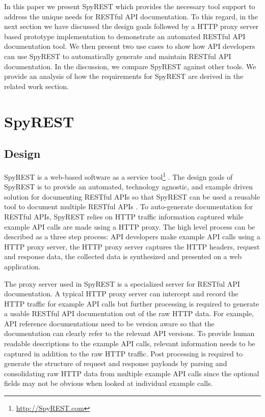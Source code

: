 \documentclass[conference]{IEEEtran}
\begin{document}
In this paper we present SpyREST which provides the necessary tool support to address the unique needs for RESTful API documentation. To this regard, in the next section we have discussed the design goals followed by a HTTP proxy server based prototype implementation to demonstrate an automated RESTful API documentation tool. We then present two use cases to show how API developers can use SpyREST to automatically generate and maintain RESTful API documentation. In the discussion, we compare SpyREST against other tools. We provide an analysis of how the requirements for SpyREST are derived in the related work section.

\section{SpyREST}

\subsection{Design} %
\label{sub:how_it_works}

SpyREST is a web-based software as a service tool\footnote{\url{http://SpyREST.com}} \cite{Sohan_spyrest}. The design goals of SpyREST is to provide an automated, technology agnostic, and example driven solution for documenting RESTful APIs so that SpyREST can be used a reusable tool to document multiple RESTful APIs . To auto-generate documentation for RESTful APIs, SpyREST relies on HTTP traffic information captured while example API calls are made using a HTTP proxy. The high level process can be described as a three step process: API developers make example API calls using a HTTP proxy server, the HTTP proxy server captures the HTTP headers, request and response data, the collected data is synthesized and presented on a web application.

The proxy server used in SpyREST is a specialized server for RESTful API documentation. A typical HTTP proxy server can intercept and record the HTTP traffic for example API calls but further processing is required to generate a usable RESTful API documentation out of the raw HTTP data. For example, API reference documentations need to be version aware so that the documentation can clearly refer to the relevant API versions. To provide human readable descriptions to the example API calls, relevant information needs to be captured in addition to the raw HTTP traffic. Post processing is required to generate the structure of request and response payloads by parsing and consolidating raw HTTP data from multiple example API calls since the optional fields may not be obvious when looked at individual example calls.
\end{document}
